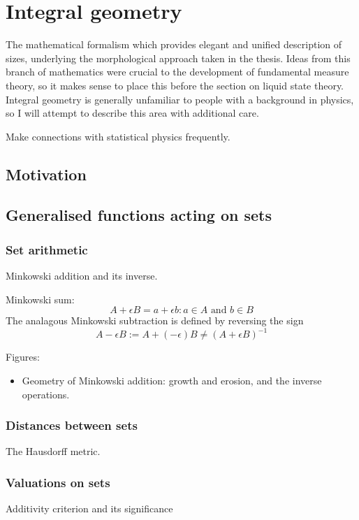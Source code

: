 \section{Integral geometry}
The mathematical formalism which provides elegant and unified description of sizes, underlying the morphological approach taken in the thesis.
Ideas from this branch of mathematics were crucial to the development of fundamental measure theory, so it makes sense to place this before the section
on liquid state theory.
Integral geometry is generally unfamiliar to people with a background in physics, so I will attempt to describe this area with additional care.

Make connections with statistical physics frequently.

\subsection{Motivation}

\subsection{Generalised functions acting on sets}
\subsubsection{Set arithmetic}
Minkowski addition and its inverse.

Minkowski sum:
\begin{equation}
  A + \epsilon B = {a + \epsilon b : a \in A \textrm{ and } b \in B}
\end{equation}
The analagous Minkowski subtraction is defined by reversing the sign
\begin{equation}
  A - \epsilon B := A + (-\epsilon) B \ne (A + \epsilon B)^{-1}
\end{equation}

Figures:
\begin{itemize}
\item Geometry of Minkowski addition: growth and erosion, and the inverse operations.
\end{itemize}

\subsubsection{Distances between sets}
The Hausdorff metric.
\subsubsection{Valuations on sets}
Additivity criterion and its significance

